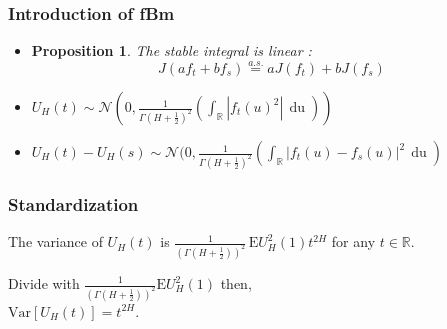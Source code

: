 \documentclass[]{beamer}
\newtheorem{proposition}{Proposition}
\begin{document}
\begin{frame}
  \frametitle{Introduction of fBm}
  \begin{itemize}
  \item
  \begin{proposition}
	The stable integral is linear\cite{samorodnitsky} :
\begin{equation*}
  J(af_t + bf_s) \overset{a.s.}{=}aJ(f_t) + bJ(f_s)
\end{equation*}
  \end{proposition}

  \item
  \begin{theorem}
	 $U_H(t) \sim \mathcal{N}(0, \frac{1}{\Gamma(H+\frac{1}{2})^2}(\int_{\mathbb{R}} |f_t(u)^2|\, \mathop{du}))$
  \end{theorem}
\vspace{1.5ex}
\pause

\item
   \begin{theorem}
	$U_H(t)-U_H(s) \sim \mathcal{N}(0, \frac{1}{\Gamma(H+\frac{1}{2})^2}(\int_{\mathbb{R}} |f_t(u)-f_s(u)|^2\, \mathop{du})$
  \end{theorem}
\end{itemize}
\end{frame}

\begin{frame}
  \frametitle{Standardization}
  \begin{corollary}
   The variance of $U_H(t)$ is $\frac{1}{(\Gamma(H+\frac{1}{2}))^2}\, \mathrm{E} U^2_H(1)t^{2H}$ for any $t \in \mathbb{R}$.
  \label{sec:fbmp1}
\end{corollary}
  Divide with $\frac{1}{(\Gamma(H+\frac{1}{2}))^2}\mathrm{E} U^2_H(1)$ then, \\
\vspace{2ex}
\hspace{8em}$\mathrm{Var}[U_H(t)]=t^{2H}$.
\end{frame}
\end{document}
